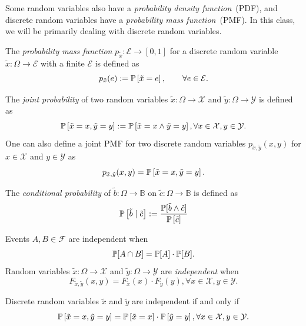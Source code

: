 Some random variables also have a \emph{probability density function}~(PDF), and discrete random variables have a \emph{probability mass function}~(PMF). In this class, we will be primarily dealing with discrete random variables.
\begin{definition}[PMF]
The \emph{probability mass function} $p_{\tilde{x}}\colon \mathcal{E} \to [0,1]$ for a discrete random variable $\tilde{x}\colon \Omega  \to  \mathcal{E}$ with a finite $\mathcal{E}$ is defined as
  \[
    p_{\tilde{x}}(e) := \mathbb{P}\left[\tilde{x} = e\right], \qquad \forall e\in \mathcal{E} .
 \]
\end{definition}


\begin{definition} \label{def:joint-probability}
The \emph{joint probability} of two random variables $\tilde{x}\colon \Omega \to \mathcal{X}$ and $\tilde{y} \colon \Omega \to \mathcal{Y}$ is defined as
\[
 \mathbb{P}\left[\tilde{x} = x, \tilde{y} = y\right] := \mathbb{P}\left[\tilde{x} = x \wedge \tilde{y} = y\right] , \forall  x\in \mathcal{X}, y\in \mathcal{Y}.
\]
One can also define a joint PMF for two discrete random variables $p_{\tilde{x}, \tilde{y}}(x,y)$ for $x\in \mathcal{X}$ and $y\in \mathcal{Y}$ as
\[
 p_{\tilde{x}, \tilde{y}}(x,y) = \mathbb{P}\left[\tilde{x} = x, \tilde{y} = y\right]. 
\]
\end{definition}

\begin{definition} \label{def:probability_cnd}
The \emph{conditional probability} of $\tilde{b}\colon \Omega \to \mathbb{B}$ on $\tilde{c}\colon \Omega \to \mathbb{B}$ is defined as
\[
\mathbb{P}\left[ \tilde{b} \mid  \tilde{c} \right]  := \frac{ \mathbb{P}[\tilde{b} \wedge \tilde{c} ] }{ \mathbb{P} \left[ \tilde{c} \right]}
\]
\end{definition}

\begin{definition}[Independent RV]
  Events $A,B \in \mathcal{F}$ are independent when
  \[
   \mathbb{P}[ A \cap B ] = \mathbb{P}[ A ] \cdot \mathbb{P}[ B ].
  \]
  Random variables $\tilde{x}\colon \Omega \to \mathcal{X}$ and $\tilde{y}\colon \Omega \to \mathcal{Y}$ are \emph{independent} when
  \[
    F_{\tilde{x}, \tilde{y}}(x,y) = F_{\tilde{x}}(x) \cdot F_{\tilde{y}}(y),
    \forall x\in \mathcal{X}, y\in \mathcal{Y}.
  \]
\end{definition}
Discrete random variables $\tilde{x}$ and $\tilde{y}$ are independent if and only if
\[
  \mathbb{P}\left[\tilde{x} = x, \tilde{y} = y\right] = \mathbb{P}\left[\tilde{x} = x\right] \cdot \mathbb{P}\left[\tilde{y} = y\right], \forall x\in \mathcal{X}, y\in \mathcal{Y}.
\]


